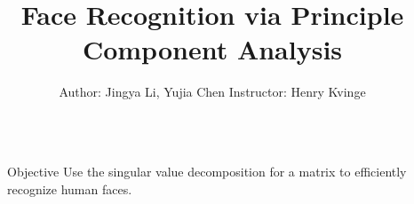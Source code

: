 \documentclass[final]{beamer}
\title{Face Recognition via Principle Component Analysis} %
\author{Author: Jingya Li, Yujia Chen Instructor: Henry Kvinge} %
\newlength{\sepwid}
\newlength{\onecolwid}
\begin{document}

\setlength{\belowcaptionskip}{2ex} %
\setlength\belowdisplayshortskip{2ex} %

\begin{frame}[t] %

\begin{columns}[t] %

\begin{column}{\sepwid}\end{column} %

\begin{column}{\onecolwid} %


\begin{alertblock}{Objective}
Use the singular value decomposition for a matrix to efficiently recognize human faces.
\end{alertblock}

\vspace{-4mm}



\end{column}
\end{columns}
\end{frame}
\end{document}
